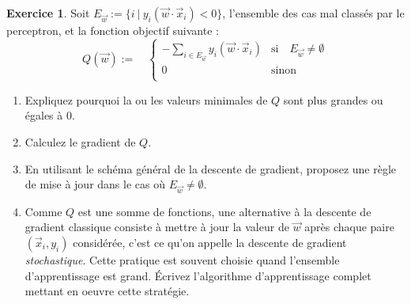 \documentclass[a4paper,francais]{article}
\theoremstyle{definition}
\newtheorem{exercice}{Exercice}[section]
\begin{document}
\begin{exercice}
  Soit $E_{\vec{w}} := \{i \ | \ y_i (\vec{w}\cdot\vec{x}_i) < 0\}$,
  l'ensemble des cas mal classés par le perceptron, 
  et la fonction objectif suivante :
  \[
  Q(\vec{w}) :=
  \quad
  \left\{
  \begin{array}{ll}
    - \sum_{i \in E_{\vec{w}}} y_i (\vec{w}\cdot\vec{x}_i) & \text{si}\quad E_{\vec{w}} \neq \emptyset \\
    0 & \text{sinon} \\
  \end{array}
  \right.
  \]

  \begin{enumerate}
  \item Expliquez pourquoi la ou les valeurs minimales de $Q$
    sont plus grandes ou égales à 0. 
  \item Calculez le gradient de $Q$.
  \item En utilisant le schéma général de la descente de gradient,
    proposez une règle de mise à jour dans le cas où $E_{\vec{w}} \neq \emptyset$. 
  \item Comme $Q$ est une somme de fonctions, une alternative à la descente de gradient classique
  consiste à mettre à jour la valeur de $\vec{w}$ après chaque paire $(\vec{x}_i, y_i)$
  considérée, c'est ce qu'on appelle la descente de gradient \emph{stochastique}.
  Cette pratique est souvent choisie quand l'ensemble d'apprentissage est grand.
  \'Ecrivez l'algorithme d'apprentissage complet mettant en oeuvre cette stratégie. 
  \end{enumerate}
\end{exercice}
\end{document}
